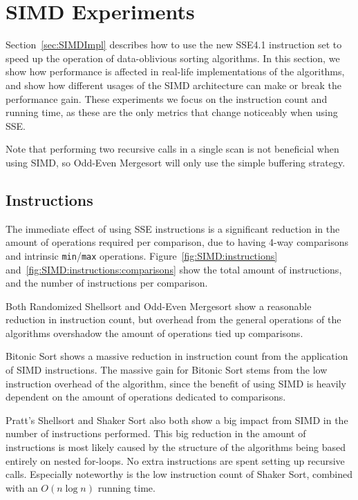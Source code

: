 \FloatBarrier
\section{SIMD Experiments}
\label{sec:SIMDExperiments}
Section~\ref{sec:SIMDImpl} describes how to use the new SSE4.1 instruction set to speed up the operation of data-oblivious sorting algorithms.
In this section, we show how performance is affected in real-life implementations of the algorithms, and show how different usages of the SIMD architecture can make or break the performance gain.
These experiments we focus on the instruction count and running time, as these are the only metrics that change noticeably when using SSE.

Note that performing two recursive calls in a single scan is not beneficial when using SIMD, so Odd-Even Mergesort will only use the simple buffering strategy.

\subsection{Instructions}

The immediate effect of using SSE instructions is a significant reduction in the amount of operations required per comparison, due to having 4-way comparisons and intrinsic \texttt{min}/\texttt{max} operations. Figure~\ref{fig:SIMD:instructions} and~\ref{fig:SIMD:instructions:comparisons} show the total amount of instructions, and the number of instructions per comparison.

Both Randomized Shellsort and Odd-Even Mergesort show a reasonable reduction in instruction count, but overhead from the general operations of the algorithms overshadow the amount of operations tied up comparisons.

Bitonic Sort shows a massive reduction in instruction count from the application of SIMD instructions. The massive gain for Bitonic Sort stems from the low instruction overhead of the algorithm, since the benefit of using SIMD is heavily dependent on the amount of operations dedicated to comparisons.

Pratt's Shellsort and Shaker Sort also both show a big impact from SIMD in the number of instructions performed. This big reduction in the amount of instructions is most likely caused by the structure of the algorithms being based entirely on nested for-loops. No extra instructions are spent setting up recursive calls. Especially noteworthy is the low instruction count of Shaker Sort, combined with an $O(n \log n)$ running time.


